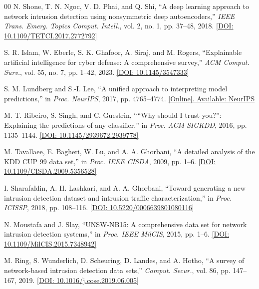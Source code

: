 \documentclass[conference]{IEEEtran}
\begin{document}
\begin{thebibliography}{00}
N. Shone, T. N. Ngoc, V. D. Phai, and Q. Shi, ``A deep learning approach to network intrusion detection using nonsymmetric deep autoencoders,'' \textit{IEEE Trans. Emerg. Topics Comput. Intell.}, vol. 2, no. 1, pp. 37--48, 2018. \href{https://doi.org/10.1109/TETCI.2017.2772792}{[DOI: 10.1109/TETCI.2017.2772792]}

S. R. Islam, W. Eberle, S. K. Ghafoor, A. Siraj, and M. Rogers, ``Explainable artificial intelligence for cyber defense: A comprehensive survey,'' \textit{ACM Comput. Surv.}, vol. 55, no. 7, pp. 1--42, 2023. \href{https://doi.org/10.1145/3547333}{[DOI: 10.1145/3547333]}

S. M. Lundberg and S.-I. Lee, ``A unified approach to interpreting model predictions,'' in \textit{Proc. NeurIPS}, 2017, pp. 4765--4774. \href{https://proceedings.neurips.cc/paper/2017/hash/8a20a8621978632d76c43dfd28b67767-Abstract.html}{[Online]. Available: NeurIPS}

M. T. Ribeiro, S. Singh, and C. Guestrin, ````Why should I trust you?'': Explaining the predictions of any classifier,'' in \textit{Proc. ACM SIGKDD}, 2016, pp. 1135--1144. \href{https://doi.org/10.1145/2939672.2939778}{[DOI: 10.1145/2939672.2939778]}

M. Tavallaee, E. Bagheri, W. Lu, and A. A. Ghorbani, ``A detailed analysis of the KDD CUP 99 data set,'' in \textit{Proc. IEEE CISDA}, 2009, pp. 1--6. \href{https://doi.org/10.1109/CISDA.2009.5356528}{[DOI: 10.1109/CISDA.2009.5356528]}

I. Sharafaldin, A. H. Lashkari, and A. A. Ghorbani, ``Toward generating a new intrusion detection dataset and intrusion traffic characterization,'' in \textit{Proc. ICISSP}, 2018, pp. 108--116. \href{https://doi.org/10.5220/0006639801080116}{[DOI: 10.5220/0006639801080116]}

N. Moustafa and J. Slay, ``UNSW-NB15: A comprehensive data set for network intrusion detection systems,'' in \textit{Proc. IEEE MilCIS}, 2015, pp. 1--6. \href{https://doi.org/10.1109/MilCIS.2015.7348942}{[DOI: 10.1109/MilCIS.2015.7348942]}

M. Ring, S. Wunderlich, D. Scheuring, D. Landes, and A. Hotho, ``A survey of network-based intrusion detection data sets,'' \textit{Comput. Secur.}, vol. 86, pp. 147--167, 2019. \href{https://doi.org/10.1016/j.cose.2019.06.005}{[DOI: 10.1016/j.cose.2019.06.005]}


\end{thebibliography}
\end{document}
